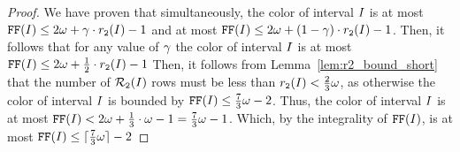 {\begin{proof}
    We have proven that simultaneously, the color of interval $I$ is at most $\text{\texttt{FF}}(I) \leq 2\omega + \gamma  \cdot r_\texttt{2}(I) - 1$ and at most $\text{\texttt{FF}}(I) \leq 2\omega + (1 - \gamma ) \cdot r_\texttt{2}(I) - 1$.
    Then, it follows that for any value of $\gamma $ the color of interval $I$ is at most $\text{\texttt{FF}}(I) \leq 2\omega + \frac{1}{2}\cdot r_\texttt{2}(I) - 1$
    Then, it follows from Lemma~\ref{lem:r2_bound_short} that the number of $\mathcal{R}_\texttt{2}(I)$ rows must be less than $r_\texttt{2}(I)  < \frac{2}{3}\omega$, as otherwise the color of interval $I$ is bounded by $\text{\texttt{FF}}(I) \leq \frac{7}{3} \omega - 2$.
    Thus, the color of interval $I$ is at most $\text{\texttt{FF}}(I) < 2\omega + \frac{1}{3}\cdot \omega - 1 = \frac{7}{3}\omega - 1$.
    Which, by the integrality of $\text{\texttt{FF}}(I)$, is at most $\text{\texttt{FF}}(I) \leq \lceil \frac{7}{3}\omega \rceil - 2$  
\end{proof}
}

